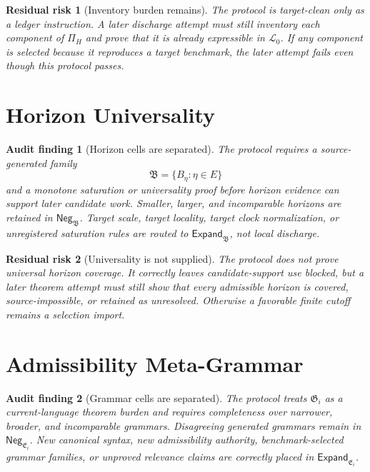 \documentclass[11pt]{article}
\newcommand{\Lang}{\mathcal{L}_{0}}
\newcommand{\HorizonFam}{\mathfrak{B}}
\newcommand{\EnumFam}{\mathfrak{E}}
\newcommand{\MetaG}{\mathfrak{G}}
\newcommand{\Neg}{\mathsf{Neg}}
\newcommand{\Expand}{\mathsf{Expand}}
\newtheorem{auditfinding}{Audit finding}
\newtheorem{residualrisk}{Residual risk}
\begin{document}
\begin{residualrisk}[Inventory burden remains]
The protocol is target-clean only as a ledger instruction. A later discharge
attempt must still inventory each component of \(\Pi_H\) and prove that it is
already expressible in \(\Lang\). If any component is selected because it
reproduces a target benchmark, the later attempt fails even though this
protocol passes.
\end{residualrisk}

\section{Horizon Universality}

\begin{auditfinding}[Horizon cells are separated]
The protocol requires a source-generated family
\[
\HorizonFam=\{B_\eta:\eta\in E\}
\]
and a monotone saturation or universality proof before horizon evidence can
support later candidate work. Smaller, larger, and incomparable horizons are
retained in \(\Neg_{\HorizonFam}\). Target scale, target locality, target
clock normalization, or unregistered saturation rules are routed to
\(\Expand_{\HorizonFam}\), not local discharge.
\end{auditfinding}

\begin{residualrisk}[Universality is not supplied]
The protocol does not prove universal horizon coverage. It correctly leaves
candidate-support use blocked, but a later theorem attempt must still show
that every admissible horizon is covered, source-impossible, or retained as
unresolved. Otherwise a favorable finite cutoff remains a selection import.
\end{residualrisk}

\section{Admissibility Meta-Grammar}

\begin{auditfinding}[Grammar cells are separated]
The protocol treats \(\MetaG_i\) as a current-language theorem burden and
requires completeness over narrower, broader, and incomparable grammars.
Disagreeing generated grammars remain in \(\Neg_{\EnumFam_i}\). New
canonical syntax, new admissibility authority, benchmark-selected grammar
families, or unproved relevance claims are correctly placed in
\(\Expand_{\EnumFam_i}\).
\end{auditfinding}
\end{document}
